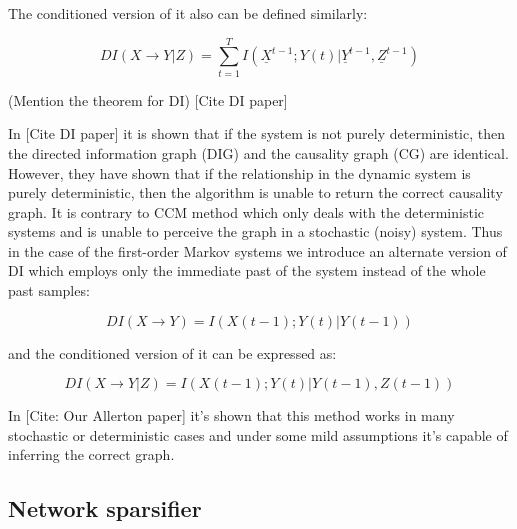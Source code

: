 \documentclass[10pt,oneside]{article}\usepackage[]{graphicx}\usepackage[]{color}
\begin{document}
The conditioned version of it also can be defined similarly:

\begin{equation}
DI(X\rightarrow Y|Z)=\sum_{t=1}^T I(\underline{X}^{t−1}; Y(t)|\underline{Y}^{t−1},\underline{Z}^{t−1})
\end{equation}

(Mention the theorem for DI) [Cite DI paper]

In [Cite DI paper] it is shown that if the system is not purely deterministic, then the directed information graph (DIG) and the causality graph (CG) are identical. However, they have shown that if the relationship in the dynamic system is purely deterministic, then the algorithm is unable to return the correct causality graph. It is contrary to CCM method which only deals with the deterministic systems and is unable to perceive the graph in a stochastic (noisy) system.
Thus in the case of the first-order Markov systems we introduce an alternate version of DI which employs only the immediate past of the system instead of the whole past samples:

\begin{equation}
DI(X\rightarrow Y)= I \left( X(t−1); Y(t)|Y(t−1) \right)
\end{equation}

and the conditioned version of it can be expressed as:

\begin{equation}
DI(X\rightarrow Y|Z)= I \left( X(t−1); Y(t)|Y(t−1),Z(t−1) \right)
\end{equation}

In [Cite: Our Allerton paper] it's shown that this method works in many stochastic or deterministic cases and under some mild assumptions it's capable of inferring the correct graph.

\subsection{Network sparsifier}
%
%
\end{document}
